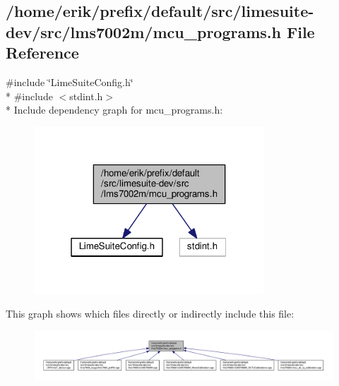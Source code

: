 \subsection{/home/erik/prefix/default/src/limesuite-\/dev/src/lms7002m/mcu\+\_\+programs.h File Reference}
\label{mcu__programs_8h}
{\ttfamily \#include \char`\"{}Lime\+Suite\+Config.\+h\char`\"{}}\\*
{\ttfamily \#include $<$stdint.\+h$>$}\\*
Include dependency graph for mcu\+\_\+programs.\+h\+:
\nopagebreak
\begin{figure}[H]
\begin{center}
\leavevmode
\includegraphics[width=244pt]{d6/dcd/mcu__programs_8h__incl}
\end{center}
\end{figure}
This graph shows which files directly or indirectly include this file\+:
\nopagebreak
\begin{figure}[H]
\begin{center}
\leavevmode
\includegraphics[width=350pt]{de/d04/mcu__programs_8h__dep__incl}
\end{center}
\end{figure}
